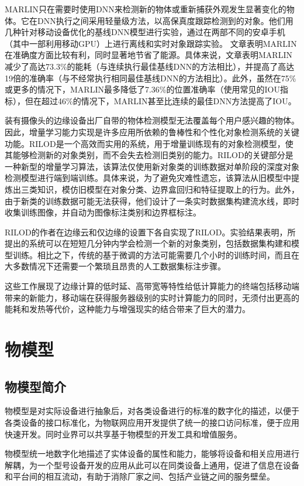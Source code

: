 MARLIN只在需要时使用DNN来检测新的物体或重新捕获外观发生显著变化的物体。它在DNN执行之间采用轻量级方法，以高保真度跟踪检测到的对象。他们用几种针对移动设备优化的基线DNN模型进行实验，通过在两部不同的安卓手机（其中一部利用移动GPU）上进行离线和实时对象跟踪实验。
文章表明MARLIN在准确度方面比较有利，同时显著地节省了能源。具体来说，文章表明MARLIN减少了高达73.3\%的能耗（与连续执行最佳基线DNN的方法相比），并提高了高达19倍的准确率（与不经常执行相同最佳基线DNN的方法相比）。此外，虽然在75\%或更多的情况下，MARLIN最多降低了7.36\%的位置准确率（使用常见的IOU指标），但在超过46\%的情况下，MARLIN甚至比连续的最佳DNN方法提高了IOU。

装有摄像头的边缘设备出厂自带的物体检测模型无法覆盖每个用户感兴趣的物体。因此，增量学习能力实现是许多应用所依赖的鲁棒性和个性化对象检测系统的关键功能。RILOD\cite{LiTasGho19}是一个高效而实用的系统，用于增量训练现有的对象检测模型，使其能够检测新的对象类别，而不会失去检测旧类别的能力。RILOD的关键部分是一种新型的增量学习算法，该算法仅使用新对象类的训练数据对单阶段的深度对象检测模型进行端到端训练。具体来说，为了避免灾难性遗忘，该算法从旧模型中提炼出三类知识，模仿旧模型在对象分类、边界盒回归和特征提取上的行为。此外，由于新类的训练数据可能无法获得，他们设计了一条实时数据集构建流水线，即时收集训练图像，并自动为图像标注类别和边界框标注。

RILOD的作者在边缘云和仅边缘的设置下各自实现了RILOD。实验结果表明，所提出的系统可以在短短几分钟内学会检测一个新的对象类别，包括数据集构建和模型训练。相比之下，传统的基于微调的方法可能需要几个小时的训练时间，而且在大多数情况下还需要一个繁琐且昂贵的人工数据集标注步骤。

这些工作展现了边缘计算的低时延、高带宽等特性给低计算能力的终端包括移动端带来的新能力，移动端在获得服务器级别的实时计算能力的同时，无须付出更高的能耗和发热等代价，这种能力与增强现实的结合带来了巨大的潜力。

\section{物模型}
\subsection{物模型简介}

物模型是对实际设备进行抽象后，对各类设备进行的标准的数字化的描述，以便于各类设备的接口标准化，为物联网应用开发提供了统一的接口访问标准，便于应用快速开发。同时业界可以共享基于物模型的开发工具和增值服务。

物模型统一地数字化地描述了实体设备的属性和能力，能够将设备和相关应用进行解耦，为一个型号设备开发的应用从此可以在同类设备上通用，促进了信息在设备和平台间的相互流动，有助于消除厂家之间、包括产业链之间的服务壁垒。

